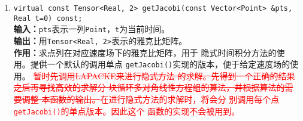 \documentclass[a4paper,twoside]{ctexart}
\begin{document}
\begin{itemize}
\begin{enumerate}[(1)]
                \item \texttt{virtual const Tensor<Real, 2> getJacobi(const Vector<Point> \&pts, Real t=0) const;}\\
                \textbf{输入：}\texttt{pts}表示一列\texttt{Point}，\texttt{t}为当前时间。\\
                \textbf{输出：}用\texttt{Tensor<Real, 2>}表示的雅克比矩阵。\\
                \textbf{作用：}求点列在对应速度场下的雅克比矩阵，用于
                隐式时间积分方法的使用。提供一个默认的调用单点
                \texttt{getJacobi()}实现的版本，便于给定速度场的使用。
                \textcolor{red}{\sout{暂时先调用LAPACKE来进行隐式方法
                    的求解。先得到一个正确的结果之后再寻找高效的求解分
                    块循环多对角线性方程组的算法，并根据算法的需要调整
                    本函数的输出。}在进行隐式方法的求解时，将会分
                  别调用每个点\texttt{getJacobi()}的单点版本。因此这个
                 函数的实现不会被用到。}
            \end{enumerate}
\end{itemize}
\end{document}
